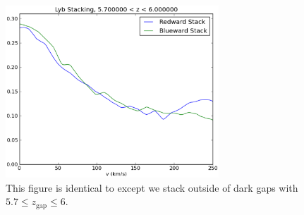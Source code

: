 \begin{figure}[!ht]
  \centering
  \includegraphics[width=8cm]{Lyb_highz.eps}
  \caption{This figure is identical to  except we stack outside of dark gaps with $5.7 \leq z_{\text{gap}} \leq 6$.}
  \label{fig:dcheck}
\end{figure}
